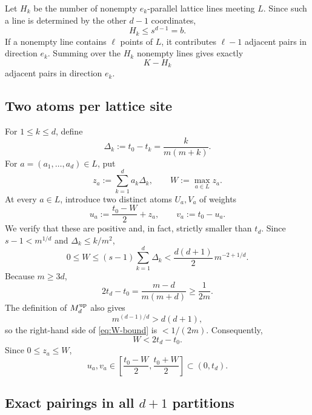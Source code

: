 \documentclass[11pt]{article}
\theoremstyle{definition}
\newcommand{\1}{\mathbf{1}}
\begin{document}
Let $H_k$ be the number of nonempty $e_k$-parallel lattice lines meeting $L$.  Since such a line is determined by the other $d-1$ coordinates,
\begin{equation}\label{eq:Hk-bound}
  H_k\le s^{d-1}=b.
\end{equation}
If a nonempty line contains $\ell$ points of $L$, it contributes $\ell-1$ adjacent pairs in direction $e_k$.  Summing over the $H_k$ nonempty lines gives exactly
\begin{equation}\label{eq:adjacent-count}
  K-H_k
\end{equation}
adjacent pairs in direction $e_k$.

\subsection{Two atoms per lattice site}

For $1\le k\le d$, define
\begin{equation}\label{eq:Delta-k}
  \Delta_k:=t_0-t_k
  =\frac{k}{m(m+k)}.
\end{equation}
For $a=(a_1,\ldots,a_d)\in L$, put
\begin{equation}\label{eq:za-W}
  z_a:=\sum_{k=1}^d a_k\Delta_k,
  \qquad
  W:=\max_{a\in L}z_a.
\end{equation}
At every $a\in L$, introduce two distinct atoms $U_a,V_a$ of weights
\begin{equation}\label{eq:uv}
  u_a:=\frac{t_0-W}{2}+z_a,
  \qquad
  v_a:=t_0-u_a.
\end{equation}
We verify that these are positive and, in fact, strictly smaller than $t_d$.
Since $s-1<m^{1/d}$ and $\Delta_k\le k/m^2$,
\begin{equation}\label{eq:W-bound}
  0\le W
  \le(s-1)\sum_{k=1}^d\Delta_k
  <\frac{d(d+1)}2\,m^{-2+1/d}.
\end{equation}
Because $m\ge3d$,
\[
  2t_d-t_0
  =\frac{m-d}{m(m+d)}
  \ge\frac1{2m}.
\]
The definition of $M_d^{\rm up}$ also gives
\[
  m^{(d-1)/d}>d(d+1),
\]
so the right-hand side of \eqref{eq:W-bound} is $<1/(2m)$.  Consequently,
\begin{equation}\label{eq:W-positive}
  W<2t_d-t_0.
\end{equation}
Since $0\le z_a\le W$,
\[
  u_a,v_a\in
  \left[\frac{t_0-W}{2},\frac{t_0+W}{2}\right]
  \subset(0,t_d).
\]

\subsection{Exact pairings in all $d+1$ partitions}
\end{document}
